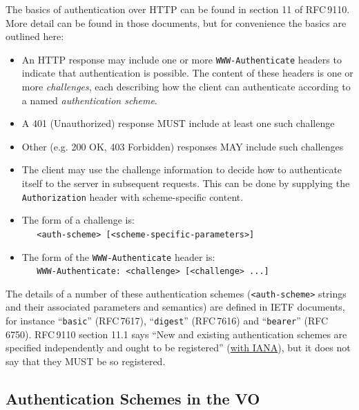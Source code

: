 \documentclass[11pt,a4paper]{ivoa}
\newcommand{\rfc}[1]{RFC\,#1}
\newcommand{\header}[1]{{\tt #1}}
\begin{document}
The basics of authentication over HTTP can be found in
section 11 of \rfc{9110}.
More detail can be found in those documents, but for convenience
the basics are outlined here:
\begin{itemize}
  \item An HTTP response may include one or more 
        \header{WWW-Authenticate} headers
        to indicate that authentication is possible.
        The content of these headers is one or more {\em challenges},
        each describing how the client can authenticate according
        to a named {\em authentication scheme}.
  \item A 401 (Unauthorized) response MUST include at least one such challenge
  \item Other (e.g. 200 OK, 403 Forbidden) responses
        MAY include such challenges
  \item The client may use the challenge information to decide how
        to authenticate itself to the server in subsequent requests.
        This can be done by supplying the \header{Authorization} header
        with scheme-specific content.
  \item The form of a challenge is:\\
        \verb|   <auth-scheme> [<scheme-specific-parameters>]|
  \item The form of the \header{WWW-Authenticate} header is:\\
        \verb|   WWW-Authenticate: <challenge> [<challenge> ...]|
\end{itemize}


The details of a number of these authentication schemes
(\verb|<auth-scheme>| strings and their associated parameters and semantics)
are defined in IETF documents, for instance
``{\tt basic}'' (\rfc{7617}),
``{\tt digest}'' (\rfc{7616})
and
``{\tt bearer}'' (\rfc{6750}).
\rfc{9110} section 11.1 says
``New and existing authentication schemes are
  specified independently and ought to be registered''
  (\href{https://www.iana.org/assignments/http-authschemes}{with IANA}),
but it does not say that they MUST be so registered.



\subsection{Authentication Schemes in the VO}
\end{document}
